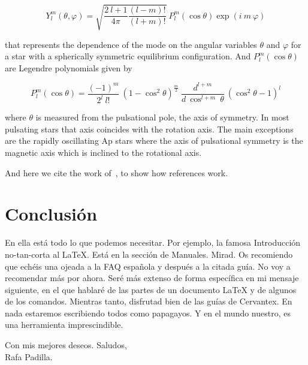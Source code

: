 \documentclass[a4paper]{article}
\begin{document}
\begin{equation}
Y_{l}^{m}(\theta,\varphi)=\sqrt{\frac{2\ l + 1}{4\pi}\frac{(l-m)!}{(l+m)!}}\ P_{l}^{m}(\cos\theta)\exp(i\ m\ \varphi)
\end{equation}


that represents the dependence of the mode on the angular variables $\theta$ and $\varphi$ for a star with a spherically symmetric equilibrium configuration. And $P_{l}^{m}(\cos\theta)$ are Legendre polynomials given by


\begin{equation}
P_{l}^{m}(\cos\theta)=\frac{(-1)^{m}}{2^{l}\ l!}\ (1- \cos^{2}\theta)^{\frac{m}{2}}\ \frac{d^{l+m}}{d\ \cos^{l+m}\ \theta}\ (\cos^{2}\theta - 1)^{l}
\end{equation}


where $\theta$ is measured from the pulsational pole, the axis of symmetry. In most pulsating stars that axis coincides with the rotation axis. The main exceptions are the rapidly oscillating Ap stars where the axis of pulsational symmetry is the magnetic axis which is inclined to the rotational axis.

And here we cite the work of~\citet{brown61}, to show how references work.

\section{Conclusión}
En ella está todo lo que podemos necesitar. Por ejemplo, la famosa Introducción no-tan-corta al \LaTeX{}. Está en la sección de Manuales. Mirad. Os recomiendo que echéis una ojeada a la FAQ española y después a la citada guía. No voy a recomendar más por ahora. Seré más extenso de forma específica en mi mensaje siguiente, en el que hablaré de las partes de un documento \LaTeX{} y de algunos de los comandos. Mientras tanto,  disfrutad bien de las guías de Cervantex. En nada estaremos escribiendo todos como papagayos. Y en el mundo nuestro, es una herramienta imprescindible.

Con mis mejores deseos. Saludos,\\
Rafa Padilla.

%
\end{document}
